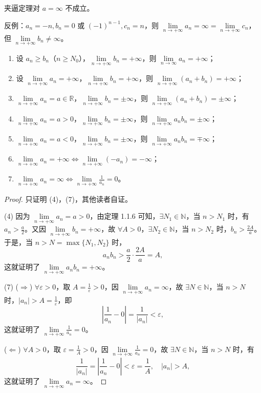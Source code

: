 \begin{remark}\label{rem:1.2.1}
夹逼定理对 $a=\infty$ 不成立。

反例：$a_{n}=-n, b_{n}=0$ 或 $(-1)^{n-1}, c_{n}=n$，则 $\lim\limits_{n\to+\infty}a_{n}=\infty=\lim\limits_{n\to+\infty}c_{n}$，但 $\lim\limits_{n\to+\infty}b_{n}\neq\infty$。
\end{remark}

\begin{theorem}\label{thm:1.2.7}
\begin{enumerate}
  \item 设 $a_{n} \geqslant b_{n}$（$n \geqslant N_{0}$），$\lim\limits_{n \to +\infty} b_{n} = +\infty$，则 $\lim\limits_{n \to \infty} a_{n} = +\infty$；
  \item 设 $\lim\limits_{n\to+\infty}a_n=+\infty$，$\lim\limits_{n\to+\infty}b_n=+\infty$，则 $\lim\limits_{n\to+\infty}(a_n+b_n)=+\infty$；
  \item $\lim\limits_{n\to+\infty}a_n=a\in\mathbb{R}$，$\lim\limits_{n\to+\infty}b_n=\pm\infty$，则 $\lim\limits_{n\to+\infty}(a_n+b_n)=\pm\infty$；
  \item $\lim\limits_{n\to+\infty}a_n=a>0$，$\lim\limits_{n\to+\infty}b_n=\pm\infty$，则 $\lim\limits_{n\to+\infty}a_n b_n=\pm\infty$；
  \item $\lim\limits_{n\to+\infty}a_n=a<0$，$\lim\limits_{n\to+\infty}b_n=\pm\infty$，则 $\lim\limits_{n\to+\infty}a_n b_n=\mp\infty$；
  \item $\lim\limits_{n \to +\infty} a_n = +\infty \iff \lim\limits_{n \to +\infty} (-a_n) = -\infty$；
  \item $\lim\limits_{n \to +\infty} a_n = \infty \iff \lim\limits_{n \to +\infty} \frac{1}{a_n} = 0$。
\end{enumerate}
\end{theorem}

\begin{proof}
只证明 (4)，(7)，其他读者自证。

(4) 因为 $\lim\limits_{n \to +\infty} a_n = a > 0$，由定理 1.1.6 可知，$\exists N_1 \in \mathbb{N}$，当 $n > N_1$ 时，有 $a_n > \frac{a}{2}$。又因 $\lim\limits_{n \to +\infty} b_n = +\infty$，故 $\forall A > 0$，$\exists N_2 \in \mathbb{N}$，当 $n > N_2$ 时，$b_n > \frac{2A}{a}$。于是，当 $n > N = \max\{N_1, N_2\}$ 时，
\[
a_{n}b_{n} > \frac{a}{2} \cdot \frac{2A}{a} = A,
\]
这就证明了 $\lim\limits_{n\to+\infty}a_nb_n=+\infty$。

(7) ($\Rightarrow$) $\forall \varepsilon > 0$，取 $A = \frac{1}{\varepsilon} > 0$，因 $\lim\limits_{n \to +\infty} a_n = \infty$，故 $\exists N \in \mathbb{N}$，当 $n > N$ 时，$|a_n| > A = \frac{1}{\varepsilon}$，即
\[
\left|\frac{1}{a_{n}}-0\right| = \frac{1}{|a_{n}|} < \varepsilon,
\]
这就证明了 $\lim\limits_{n\to+\infty}\frac{1}{a_n}=0$。

($\Leftarrow$) $\forall A>0$，取 $\varepsilon=\frac{1}{A}>0$，因 $\lim\limits_{n\to+\infty}\frac{1}{a_n}=0$，故 $\exists N\in\mathbb{N}$，当 $n>N$ 时，有
\[
\frac{1}{|a_{n}|} = \left|\frac{1}{a_{n}}-0\right| < \varepsilon = \frac{1}{A},\quad |a_{n}| > A,
\]
这就证明了 $\lim\limits_{n\to+\infty}a_n=\infty$。
\end{proof}

